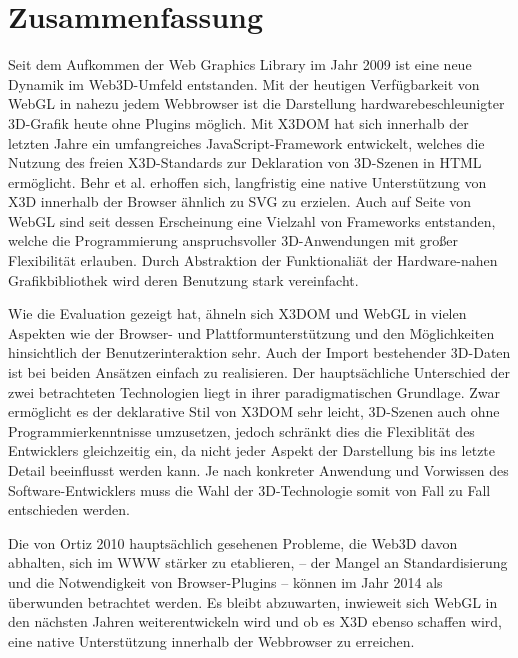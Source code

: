\chapter{Zusammenfassung}

Seit dem Aufkommen der Web Graphics Library im Jahr 2009 ist eine neue Dynamik im Web3D-Umfeld entstanden. Mit der heutigen Verfügbarkeit von WebGL in nahezu jedem Webbrowser ist die Darstellung hardwarebeschleunigter 3D-Grafik heute ohne Plugins möglich. Mit X3DOM hat sich innerhalb der letzten Jahre ein umfangreiches JavaScript-Framework entwickelt, welches die Nutzung des freien X3D-Standards zur Deklaration von 3D-Szenen in HTML ermöglicht. Behr et al. erhoffen sich, langfristig eine native Unterstützung von X3D innerhalb der Browser ähnlich zu SVG zu erzielen. Auch auf Seite von WebGL sind seit dessen Erscheinung eine Vielzahl von Frameworks entstanden, welche die Programmierung anspruchsvoller 3D-Anwendungen mit großer Flexibilität erlauben. Durch Abstraktion der Funktionaliät der Hardware-nahen Grafikbibliothek wird deren Benutzung stark vereinfacht.

Wie die Evaluation gezeigt hat, ähneln sich X3DOM und WebGL in vielen Aspekten wie der Browser- und Plattformunterstützung und den Möglichkeiten hinsichtlich der Benutzerinteraktion sehr. Auch der Import bestehender 3D-Daten ist bei beiden Ansätzen einfach zu realisieren. Der hauptsächliche Unterschied der zwei betrachteten Technologien liegt in ihrer paradigmatischen Grundlage. Zwar ermöglicht es der deklarative Stil von X3DOM sehr leicht, 3D-Szenen auch ohne Programmierkenntnisse umzusetzen, jedoch schränkt dies die Flexiblität des Entwicklers gleichzeitig ein, da nicht jeder Aspekt der Darstellung bis ins letzte Detail beeinflusst werden kann. Je nach konkreter Anwendung und Vorwissen des Software-Entwicklers muss die Wahl der 3D-Technologie somit von Fall zu Fall entschieden werden.

Die von Ortiz 2010 hauptsächlich gesehenen Probleme, die Web3D davon abhalten, sich im WWW stärker zu etablieren, -- der Mangel an Standardisierung und die Notwendigkeit von Browser-Plugins -- können im Jahr 2014 als überwunden betrachtet werden. Es bleibt abzuwarten, inwieweit sich WebGL in den nächsten Jahren weiterentwickeln wird und ob es X3D ebenso schaffen wird, eine native Unterstützung innerhalb der Webbrowser zu erreichen.